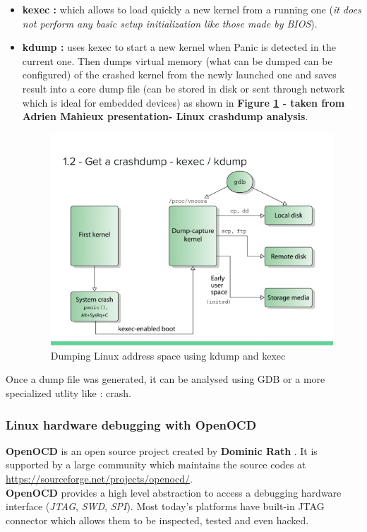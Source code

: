 \begin{itemize}
\begin{itemize}
	\item \textbf{kexec : } which allows to load quickly a new kernel from a running one (\textit{it does not perform any basic setup initialization like those made by BIOS}).
	\item \textbf{kdump : } uses kexec to start a new kernel when Panic is detected in the current one. Then dumps virtual memory (what can be dumped can be configured) of the crashed kernel from the newly launched one and saves result into a core dump file (can be stored in disk or sent through network which is ideal for embedded devices) as shown in \textbf{Figure \ref{Dumping Linux address space using kdump and kexec} - taken from Adrien Mahieux presentation- Linux crashdump analysis}. 
	\begin{figure}[H]
		\centering
        \includegraphics[scale=0.40]{img/solution/kdump-kexec.jpg}
        \caption{Dumping Linux address space using kdump and kexec}
        \label{Dumping Linux address space using kdump and kexec}
    \end{figure}

\end{itemize}




Once a dump file was generated, it can be analysed using GDB or a more specialized utlity like : crash.
	
\end{itemize}


\subsubsection{Linux hardware debugging with OpenOCD}
\label{Linux hardware debugging with OpenOCD}
\textbf{OpenOCD} is an open source project created by \og \textbf{Dominic Rath} \fg . It is supported by a large community which
maintains the source codes at {\color{blue}\url{https://sourceforge.net/projects/openocd/}}.\\
\textbf{OpenOCD} provides a high level abstraction to access a debugging hardware interface (\emph{JTAG}, \emph{SWD}, \emph{SPI}). Most
today's platforms have built-in JTAG connector which allows them to be {\color{green}inspected}, {\color{orange}tested} and even {\color{red}hacked}.

